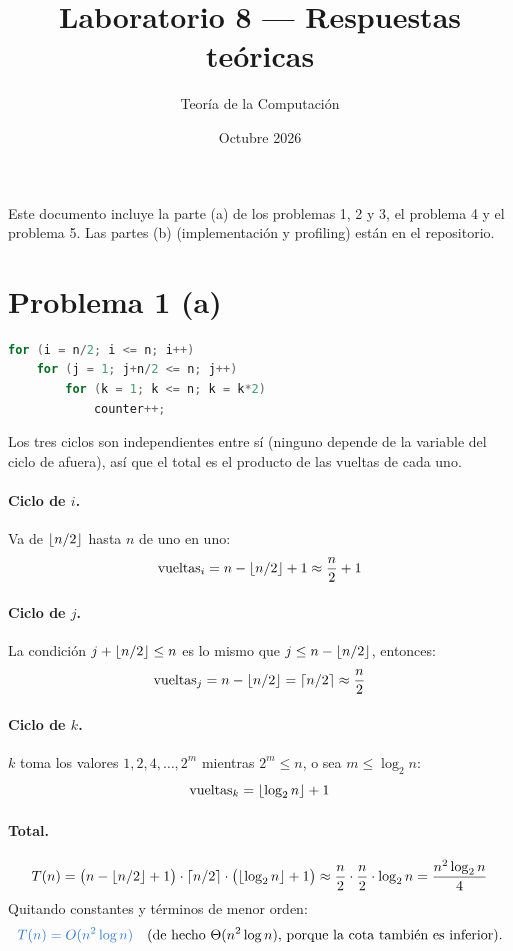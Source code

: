 \documentclass[11pt]{article}
\title{Laboratorio 8 --- Respuestas teóricas}
\author{Teoría de la Computación}
\date{Octubre 2026}
\DeclarePairedDelimiter{\floor}{\lfloor}{\rfloor}
\DeclarePairedDelimiter{\ceil}{\lceil}{\rceil}
\newcommand{\res}[1]{\textcolor{azul}{\textbf{#1}}}
\begin{document}
\maketitle

\noindent Este documento incluye la parte (a) de los problemas 1, 2 y 3, el problema 4
y el problema 5. Las partes (b) (implementación y profiling) están en el repositorio.

\section*{Problema 1 (a)}

\begin{lstlisting}[language=C]
for (i = n/2; i <= n; i++)
    for (j = 1; j+n/2 <= n; j++)
        for (k = 1; k <= n; k = k*2)
            counter++;
\end{lstlisting}

Los tres ciclos son independientes entre sí (ninguno depende de la variable del ciclo de
afuera), así que el total es el producto de las vueltas de cada uno.

\paragraph{Ciclo de $i$.} Va de $\floor{n/2}$ hasta $n$ de uno en uno:
\[
  \text{vueltas}_i = n - \floor{n/2} + 1 \approx \frac{n}{2} + 1
\]

\paragraph{Ciclo de $j$.} La condición $j + \floor{n/2} \le n$ es lo mismo que
$j \le n - \floor{n/2}$, entonces:
\[
  \text{vueltas}_j = n - \floor{n/2} = \ceil{n/2} \approx \frac{n}{2}
\]

\paragraph{Ciclo de $k$.} $k$ toma los valores $1, 2, 4, \dots, 2^m$ mientras
$2^m \le n$, o sea $m \le \log_2 n$:
\[
  \text{vueltas}_k = \floor{\log_2 n} + 1
\]

\paragraph{Total.}
\[
  T(n) = \bigl(n - \floor{n/2} + 1\bigr)\cdot\ceil{n/2}\cdot\bigl(\floor{\log_2 n} + 1\bigr)
  \approx \frac{n}{2}\cdot\frac{n}{2}\cdot\log_2 n = \frac{n^2 \log_2 n}{4}
\]
Quitando constantes y términos de menor orden:
\[
  \res{$T(n) = O(n^2 \log n)$} \quad \text{(de hecho $\Theta(n^2\log n)$, porque la cota también es inferior).}
\]
\end{document}
